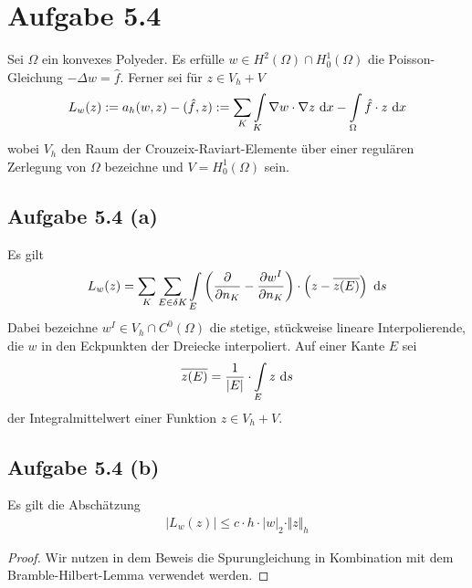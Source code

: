 \documentclass[12pt,a4paper]{article}
\begin{document}
\section*{Aufgabe 5.4}
Sei $\Omega$ ein konvexes Polyeder. Es erfülle $w\in H^2(\Omega)\cap H_0^1(\Omega)$ die Poisson-Gleichung $-\Delta w=\hat{f}$. Ferner sei für $z\in V_h+V$
\begin{align*}
L_w(z):=a_h(w,z)-(\hat{f},z):=\sum\limits_K\int\limits_K\nabla w\cdot\nabla z\text{ d} x-\int\limits_\Omega\hat{f}\cdot z\text{ d} x
\end{align*}
wobei $V_h$ den Raum der Crouzeix-Raviart-Elemente über einer regulären Zerlegung von $\Omega$ bezeichne und $V=H_0^1(\Omega)$ sein.

\subsection*{Aufgabe 5.4 (a)}
Es gilt
\begin{align*}
L_w(z)=\sum\limits_K\sum\limits_{E\in\delta K}\int\limits_E\left(\frac{\partial}{\partial n_K}-\frac{\partial w^I}{\partial n_K}\right)\cdot\left(z-\overline{z(E)}\right)\text{ d} s
\end{align*}
Dabei bezeichne $w^I\in V_h\cap C^0(\Omega)$ die stetige, stückweise lineare Interpolierende, die $w$ in den Eckpunkten der Dreiecke interpoliert. Auf einer Kante $E$ sei
\begin{align*}
\overline{z(E)}=\frac{1}{|E|}\cdot\int\limits_E z\text{ d} s
\end{align*}
der Integralmittelwert einer Funktion $z\in V_h+V$.

\subsection*{Aufgabe 5.4 (b)}
Es gilt die Abschätzung
\begin{align*}
\big|L_w(z)\big|\leq c\cdot h\cdot|w|_2\cdot\Vert z\Vert_h
\end{align*}
\begin{proof}
Wir nutzen in dem Beweis die Spurungleichung in Kombination mit dem Bramble-Hilbert-Lemma verwendet werden.
\end{proof}
\end{document}
